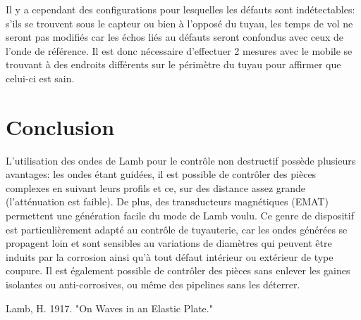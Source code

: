 \documentclass[twoside]{article}
\begin{document}
\begin{multicols}{2}
Il y a cependant des configurations pour lesquelles les défauts sont indétectables: s'ils se trouvent sous le capteur ou bien à l'opposé du tuyau, les temps de vol ne seront pas modifiés car les échos liés au défauts seront confondus avec ceux de l'onde de référence. Il est donc nécessaire d'effectuer 2 mesures avec le mobile se trouvant à des endroits différents sur le périmètre du tuyau pour affirmer que celui-ci est sain.



\section{Conclusion}
L'utilisation des ondes de Lamb pour le contrôle non destructif possède plusieurs avantages: les ondes étant guidées, il est possible de contrôler des pièces complexes en suivant leurs profils et ce, sur des distance assez grande (l'atténuation est faible). De plus, des transducteurs magnétiques (EMAT) permettent une génération facile du mode de Lamb voulu. Ce genre de dispositif est particulièrement adapté au contrôle de tuyauterie, car les ondes générées se propagent loin et sont sensibles au variations de diamètres qui peuvent être induits par la corrosion ainsi qu'à tout défaut intérieur ou extérieur de type coupure. Il est également possible de contrôler des pièces sans enlever les gaines isolantes ou anti-corrosives, ou même des pipelines sans les déterrer.


\begin{thebibliography}{99} %

Lamb, H. 1917.
\newblock"On Waves in an Elastic Plate."
 
\end{thebibliography}


\end{multicols}
\end{document}
